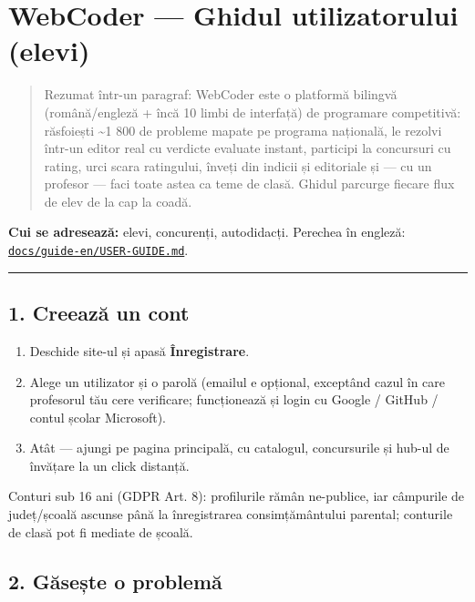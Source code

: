 \documentclass[
]{article}
\author{}
\date{}
\providecommand{\tightlist}{%
  \setlength{\itemsep}{0pt}\setlength{\parskip}{0pt}}
\begin{document}
{
\setcounter{tocdepth}{2}
\tableofcontents
}
\section{WebCoder --- Ghidul utilizatorului
(elevi)}\label{webcoder--ghidul-utilizatorului-elevi}

\begin{quote}
Rezumat într-un paragraf: WebCoder este o platformă bilingvă
(română/engleză + încă 10 limbi de interfață) de programare competitivă:
răsfoiești \textasciitilde1 800 de probleme mapate pe programa
națională, le rezolvi într-un editor real cu verdicte evaluate instant,
participi la concursuri cu rating, urci scara ratingului, înveți din
indicii și editoriale și --- cu un profesor --- faci toate astea ca teme
de clasă. Ghidul parcurge fiecare flux de elev de la cap la coadă.
\end{quote}

\textbf{Cui se adresează:} elevi, concurenți, autodidacți. Perechea în
engleză:
\href{../guide-en/USER-GUIDE.md}{\texttt{docs/guide-en/USER-GUIDE.md}}.

\begin{center}\rule{0.5\linewidth}{0.5pt}\end{center}

\subsection{1. Creează un cont}\label{1-creeazux103-un-cont}

\begin{enumerate}
\def\labelenumi{\arabic{enumi}.}
\tightlist
\item
  Deschide site-ul și apasă \textbf{Înregistrare}.
\item
  Alege un utilizator și o parolă (emailul e opțional, exceptând cazul
  în care profesorul tău cere verificare; funcționează și login cu
  Google / GitHub / contul școlar Microsoft).
\item
  Atât --- ajungi pe pagina principală, cu catalogul, concursurile și
  hub-ul de învățare la un click distanță.
\end{enumerate}

Conturi sub 16 ani (GDPR Art. 8): profilurile rămân ne-publice, iar
câmpurile de județ/școală ascunse până la înregistrarea consimțământului
parental; conturile de clasă pot fi mediate de școală.

\subsection{2. Găsește o
problemă}\label{2-gux103seux219te-o-problemux103}
\end{document}
